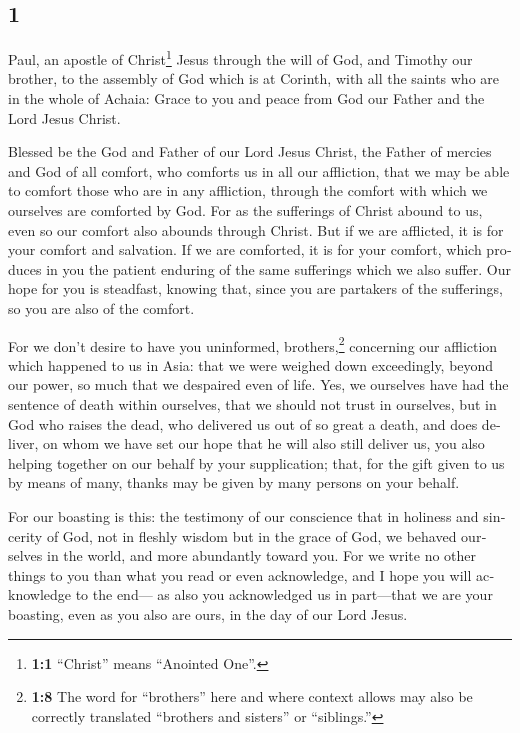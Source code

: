 \begin{paracol}{2}
\switchcolumn
\begin{otherlanguage}{english}

\hypertarget{section-1}{%
\section{1}\label{section-1}}

 Paul, an apostle of Christ\footnote{\textbf{1:1}
  ``Christ'' means ``Anointed One''.} Jesus through the will of God, and
Timothy our brother, to the assembly of God which is at Corinth, with
all the saints who are in the whole of Achaia:  Grace to
you and peace from God our Father and the Lord Jesus Christ.

 Blessed be the God and Father of our Lord Jesus Christ,
the Father of mercies and God of all comfort,  who
comforts us in all our affliction, that we may be able to comfort those
who are in any affliction, through the comfort with which we ourselves
are comforted by God.  For as the sufferings of Christ
abound to us, even so our comfort also abounds through Christ.
 But if we are afflicted, it is for your comfort and
salvation. If we are comforted, it is for your comfort, which produces
in you the patient enduring of the same sufferings which we also suffer.
 Our hope for you is steadfast, knowing that, since you
are partakers of the sufferings, so you are also of the comfort.

 For we don't desire to have you uninformed,
brothers,\footnote{\textbf{1:8} The word for ``brothers'' here and where
  context allows may also be correctly translated ``brothers and
  sisters'' or ``siblings.''} concerning our affliction which happened
to us in Asia: that we were weighed down exceedingly, beyond our power,
so much that we despaired even of life.  Yes, we ourselves
have had the sentence of death within ourselves, that we should not
trust in ourselves, but in God who raises the dead,  who
delivered us out of so great a death, and does deliver, on whom we have
set our hope that he will also still deliver us,  you
also helping together on our behalf by your supplication; that, for the
gift given to us by means of many, thanks may be given by many persons
on your behalf.

 For our boasting is this: the testimony of our
conscience that in holiness and sincerity of God, not in fleshly wisdom
but in the grace of God, we behaved ourselves in the world, and more
abundantly toward you.  For we write no other things to
you than what you read or even acknowledge, and I hope you will
acknowledge to the end---  as also you acknowledged us in
part---that we are your boasting, even as you also are ours, in the day
of our Lord Jesus.


\end{otherlanguage}
\end{paracol}
